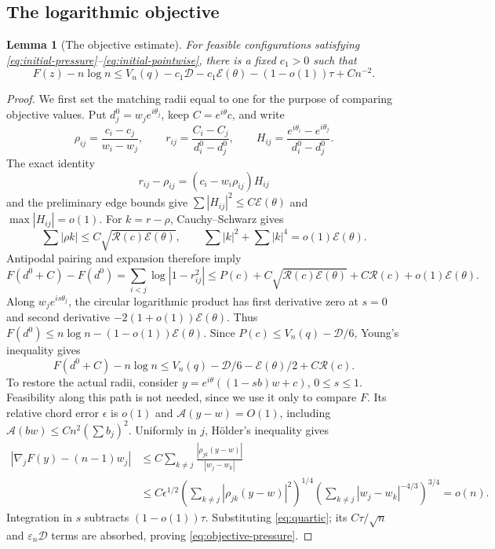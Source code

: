 \documentclass[11pt,reqno]{amsart}
\numberwithin{equation}{section}
\newtheorem{lemma}[theorem]{Lemma}
\theoremstyle{definition}
\theoremstyle{remark}
\newcommand{\A}{\mathcal A}
\newcommand{\E}{\mathcal E}
\begin{document}
\subsection{The logarithmic objective}
\begin{lemma}[The objective estimate]\label{lem:objective-pressure}
For feasible configurations satisfying \eqref{eq:initial-pressure}--\eqref{eq:initial-pointwise}, there is a fixed $c_1>0$ such that
\begin{equation}\label{eq:objective-pressure}
 F(z)-n\log n\le V_n(q)-c_1\mathscr D-c_1\E(\theta)-(1-o(1))\tau+Cn^{-2}.
\end{equation}
\end{lemma}
\begin{proof}
We first set the matching radii equal to one for the purpose of comparing objective values. Put $d_j^0=w_je^{i\theta_j}$, keep $C=e^{i\theta}c$, and write
\[
 \rho_{ij}=\frac{c_i-c_j}{w_i-w_j},\qquad
 r_{ij}=\frac{C_i-C_j}{d_i^0-d_j^0},\qquad
 H_{ij}=\frac{e^{i\theta_i}-e^{i\theta_j}}{d_i^0-d_j^0}.
\]
The exact identity
\begin{equation}\label{eq:deformed-ratio}
 r_{ij}-\rho_{ij}=(c_i-w_i\rho_{ij})H_{ij}
\end{equation}
and the preliminary edge bounds give $\sum|H_{ij}|^2\le C\E(\theta)$ and $\max|H_{ij}|=o(1)$. For $k=r-\rho$, Cauchy--Schwarz gives
\[
 \sum|\rho k|\le C\sqrt{\mathcal R(c)\E(\theta)},\qquad
 \sum|k|^2+\sum|k|^4=o(1)\E(\theta).
\]
Antipodal pairing and expansion therefore imply
\[
 F(d^0+C)-F(d^0)=\sum_{i<j}\log|1-r_{ij}^2|
 \le P(c)+C\sqrt{\mathcal R(c)\E(\theta)}+C\mathcal R(c)+o(1)\E(\theta).
\]
Along $w_je^{is\theta_j}$, the circular logarithmic product has first derivative zero at $s=0$ and second derivative $-2(1+o(1))\E(\theta)$. Thus $F(d^0)\le n\log n-(1-o(1))\E(\theta)$. Since $P(c)\le V_n(q)-\mathscr D/6$, Young's inequality gives
\[
 F(d^0+C)-n\log n\le V_n(q)-\mathscr D/6-\E(\theta)/2+C\mathcal R(c).
\]
To restore the actual radii, consider $y=e^{i\theta}((1-sb)w+c)$, $0\le s\le1$. Feasibility along this path is not needed, since we use it only to compare $F$. Its relative chord error $\epsilon$ is $o(1)$ and $\A(y-w)=O(1)$, including $\A(bw)\le Cn^2(\sum b_j)^2$. Uniformly in $j$, H\"older's inequality gives
\begin{align*}
 |\nabla_jF(y)-(n-1)w_j|
 &\le C\sum_{k\ne j}\frac{|\rho_{jk}(y-w)|}{|w_j-w_k|}\\
 &\le C\epsilon^{1/2}\left(\sum_{k\ne j}|\rho_{jk}(y-w)|^2\right)^{1/4}
 \left(\sum_{k\ne j}|w_j-w_k|^{-4/3}\right)^{3/4}=o(n).
\end{align*}
Integration in $s$ subtracts $(1-o(1))\tau$. Substituting \eqref{eq:quartic}; its $C\tau/\sqrt n$ and $\varepsilon_n\mathscr D$ terms are absorbed, proving \eqref{eq:objective-pressure}.
\end{proof}
\end{document}

